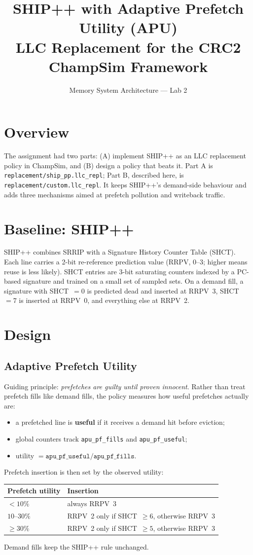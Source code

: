 \documentclass[11pt]{article}
\title{SHIP++ with Adaptive Prefetch Utility (APU)\\\large LLC Replacement for the CRC2 ChampSim Framework}
\author{Memory System Architecture --- Lab 2}
\date{}
\begin{document}
\maketitle

\section{Overview}
The assignment had two parts: (A) implement SHIP++ as an LLC replacement policy in
ChampSim, and (B) design a policy that beats it. Part A is
\texttt{replacement/ship\_pp.llc\_repl}; Part B, described here, is
\texttt{replacement/custom.llc\_repl}. It keeps SHIP++'s demand-side behaviour and adds
three mechanisms aimed at prefetch pollution and writeback traffic.

\section{Baseline: SHIP++}
SHIP++ combines SRRIP with a Signature History Counter Table (SHCT). Each line carries a
2-bit re-reference prediction value (RRPV, 0--3; higher means reuse is less likely).
SHCT entries are 3-bit saturating counters indexed by a PC-based signature and trained on
a small set of sampled sets. On a demand fill, a signature with SHCT~$=0$ is predicted dead
and inserted at RRPV~3, SHCT~$=7$ is inserted at RRPV~0, and everything else at RRPV~2.

\section{Design}
\subsection{Adaptive Prefetch Utility}
Guiding principle: \emph{prefetches are guilty until proven innocent}. Rather than treat
prefetch fills like demand fills, the policy measures how useful prefetches actually are:
\begin{itemize}
  \item a prefetched line is \textbf{useful} if it receives a demand hit before eviction;
  \item global counters track \texttt{apu\_pf\_fills} and \texttt{apu\_pf\_useful};
  \item utility $= \texttt{apu\_pf\_useful} / \texttt{apu\_pf\_fills}$.
\end{itemize}
Prefetch insertion is then set by the observed utility:
\begin{center}
\begin{tabular}{ll}
  \toprule
  Prefetch utility & Insertion \\
  \midrule
  $<10\%$     & always RRPV~3 \\
  $10$--$30\%$ & RRPV~2 only if SHCT~$\ge 6$, otherwise RRPV~3 \\
  $\ge 30\%$  & RRPV~2 only if SHCT~$\ge 5$, otherwise RRPV~3 \\
  \bottomrule
\end{tabular}
\end{center}
Demand fills keep the SHIP++ rule unchanged.
\end{document}
